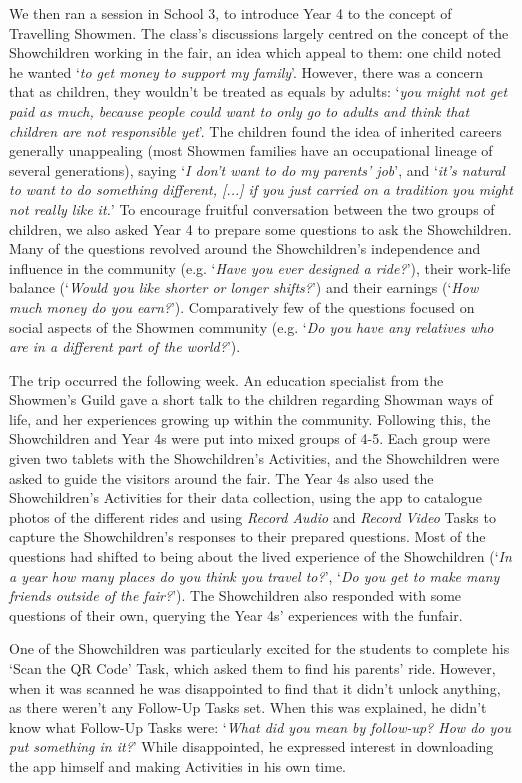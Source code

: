 \documentclass[,hyphens]{sigchi}
\begin{document}
We then ran a session in School 3, to introduce Year 4 to the concept of Travelling Showmen. The class's discussions largely centred on the concept of the Showchildren working in the fair, an idea which appeal to them: one child noted he wanted `\textit{to get money to support my family}'. However, there was a concern that as children, they wouldn't be treated as equals by adults: `\textit{you might not get paid as much, because people could want to only go to adults and think that children are not responsible yet}'. The children found the idea of inherited careers generally unappealing (most Showmen families have an occupational lineage of several generations), saying `\textit{I don't want to do my parents' job}', and `\textit{it's natural to want to do something different, [...] if you just carried on a tradition you might not really like it.}' To encourage fruitful conversation between the two groups of children, we also asked Year 4 to prepare some questions to ask the Showchildren. Many of the questions revolved around the Showchildren's independence and influence in the community (e.g. `\textit{Have you ever designed a ride?}'), their work-life balance (`\textit{Would you like shorter or longer shifts?}') and their earnings (`\textit{How much money do you earn?}'). Comparatively few of the questions focused on social aspects of the Showmen community (e.g. `\textit{Do you have any relatives who are in a different part of the world?}').

The trip occurred the following week. An education specialist from the Showmen's Guild gave a short talk to the children regarding Showman ways of life, and her experiences growing up within the community. Following this, the Showchildren and Year 4s were put into mixed groups of 4-5. Each group were given two tablets with the Showchildren's Activities, and the Showchildren were asked to guide the visitors around the fair. The Year 4s also used the Showchildren's Activities for their data collection, using the app to catalogue photos of the different rides and using \textit{Record Audio} and \textit{Record Video} Tasks to capture the Showchildren's responses to their prepared questions. Most of the questions had shifted to being about the lived experience of the Showchildren (`\textit{In a year how many places do you think you travel to?}', `\textit{Do you get to make many friends outside of the fair?}'). The Showchildren also responded with some questions of their own, querying the Year 4s' experiences with the funfair.

One of the Showchildren was particularly excited for the students to complete his `Scan the QR Code' Task, which asked them to find his parents' ride. However, when it was scanned he was disappointed to find that it didn't unlock anything, as there weren't any Follow-Up Tasks set. When this was explained, he didn't know what Follow-Up Tasks were: `\textit{What did you mean by follow-up? How do you put something in it?}' While disappointed, he expressed interest in downloading the app himself and making Activities in his own time.
\end{document}
